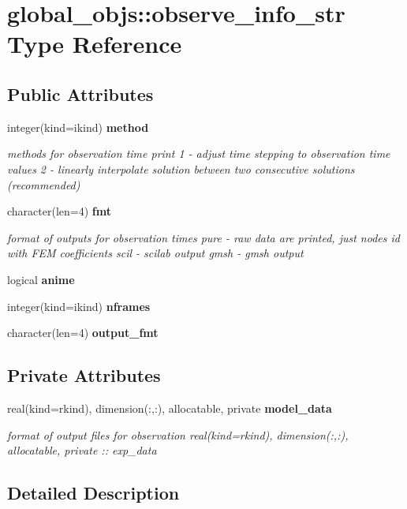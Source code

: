 \section{global\+\_\+objs\+:\+:observe\+\_\+info\+\_\+str Type Reference}
\label{structglobal__objs_1_1observe__info__str}
\subsection*{Public Attributes}
\begin{DoxyCompactItemize}
\item 
integer(kind=ikind) {\bf method}
\begin{DoxyCompactList}\small\item\em methods for observation time print 1 -\/ adjust time stepping to observation time values 2 -\/ linearly interpolate solution between two consecutive solutions (recommended) \end{DoxyCompactList}\item 
character(len=4) {\bf fmt}
\begin{DoxyCompactList}\small\item\em format of outputs for observation times pure -\/ raw data are printed, just nodes id with F\+EM coefficients scil -\/ scilab output gmsh -\/ gmsh output \end{DoxyCompactList}\item 
logical {\bf anime}
\item 
integer(kind=ikind) {\bf nframes}
\item 
character(len=4) {\bf output\+\_\+fmt}
\end{DoxyCompactItemize}
\subsection*{Private Attributes}
\begin{DoxyCompactItemize}
\item 
real(kind=rkind), dimension(\+:,\+:), allocatable, private {\bf model\+\_\+data}
\begin{DoxyCompactList}\small\item\em format of output files for observation real(kind=rkind), dimension(\+:,\+:), allocatable, private \+:\+: exp\+\_\+data \end{DoxyCompactList}\end{DoxyCompactItemize}


\subsection{Detailed Description}


